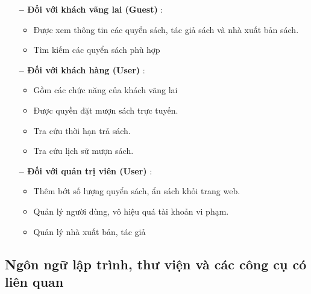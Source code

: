 \begin{itemize}[align=left, leftmargin=2cm]
  \item[\textbf{-- Đối với khách vãng lai (Guest)}]:
        \begin{itemize}[label={+}]
          \item Được xem thông tin các quyển sách, tác giả sách và nhà xuất bản sách.
          \item Tìm kiếm các quyển sách phù hợp
        \end{itemize}
  \item[\textbf{-- Đối với khách hàng (User)}]:
        \begin{itemize}[label={+}]
          \item Gồm các chức năng của khách vãng lai
          \item Được quyền đặt mượn sách trực tuyến.
          \item Tra cứu thời hạn trả sách.
          \item Tra cứu lịch sử mượn sách.
        \end{itemize}
  \item[\textbf{-- Đối với quản trị viên (User)}]:
        \begin{itemize}[label={+}]
          \item Thêm bớt số lượng quyển sách, ẩn sách khỏi trang web.
          \item Quản lý người dùng, vô hiệu quá tài khoản vi phạm.
          \item Quản lý nhà xuất bản, tác giả
        \end{itemize}
\end{itemize}


\subsection{Ngôn ngữ lập trình, thư viện và các công cụ có liên quan}

